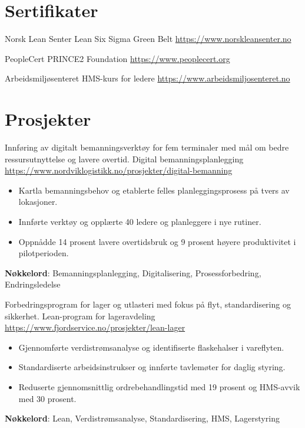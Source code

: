 \documentclass[a4paper, serif, 10pt]{moderncv}
\begin{document}
\section{Sertifikater}

        {Norsk Lean Senter}
        {Lean Six Sigma Green Belt}
        {\url{https://www.norskleansenter.no}}
        {}
        {}

        {PeopleCert}
        {PRINCE2 Foundation}
        {\url{https://www.peoplecert.org}}
        {}
        {}

        {Arbeidsmiljøsenteret}
        {HMS-kurs for ledere}
        {\url{https://www.arbeidsmiljosenteret.no}}
        {}
        {}
\section{Prosjekter}

        {Innføring av digitalt bemanningsverktøy for fem terminaler med mål om bedre ressursutnyttelse og lavere overtid.}
        {Digital bemanningsplanlegging}
        {\url{https://www.nordviklogistikk.no/prosjekter/digital-bemanning}}
        {}
        {\begin{itemize}
\item Kartla bemanningsbehov og etablerte felles planleggingsprosess på tvers av lokasjoner.
\item Innførte verktøy og opplærte 40 ledere og planleggere i nye rutiner.
\item Oppnådde 14 prosent lavere overtidsbruk og 9 prosent høyere produktivitet i pilotperioden.
\end{itemize}
\textbf{Nøkkelord}: Bemanningsplanlegging, Digitalisering, Prosessforbedring, Endringsledelse}

        {Forbedringsprogram for lager og utlasteri med fokus på flyt, standardisering og sikkerhet.}
        {Lean-program for lageravdeling}
        {\url{https://www.fjordservice.no/prosjekter/lean-lager}}
        {}
        {\begin{itemize}
\item Gjennomførte verdistrømsanalyse og identifiserte flaskehalser i vareflyten.
\item Standardiserte arbeidsinstrukser og innførte tavlemøter for daglig styring.
\item Reduserte gjennomsnittlig ordrebehandlingstid med 19 prosent og HMS-avvik med 30 prosent.
\end{itemize}
\textbf{Nøkkelord}: Lean, Verdistrømsanalyse, Standardisering, HMS, Lagerstyring}
\end{document}
